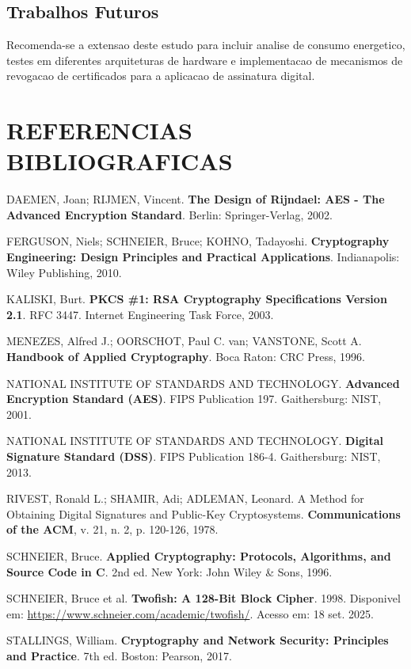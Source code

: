 \documentclass[12pt,a4paper,oneside]{article}
\begin{document}
\subsection{Trabalhos Futuros}

Recomenda-se a extensao deste estudo para incluir analise de consumo energetico, testes em diferentes arquiteturas de hardware e implementacao de mecanismos de revogacao de certificados para a aplicacao de assinatura digital.

\section{REFERENCIAS BIBLIOGRAFICAS}

DAEMEN, Joan; RIJMEN, Vincent. \textbf{The Design of Rijndael: AES - The Advanced Encryption Standard}. Berlin: Springer-Verlag, 2002.

FERGUSON, Niels; SCHNEIER, Bruce; KOHNO, Tadayoshi. \textbf{Cryptography Engineering: Design Principles and Practical Applications}. Indianapolis: Wiley Publishing, 2010.

KALISKI, Burt. \textbf{PKCS \#1: RSA Cryptography Specifications Version 2.1}. RFC 3447. Internet Engineering Task Force, 2003.

MENEZES, Alfred J.; OORSCHOT, Paul C. van; VANSTONE, Scott A. \textbf{Handbook of Applied Cryptography}. Boca Raton: CRC Press, 1996.

NATIONAL INSTITUTE OF STANDARDS AND TECHNOLOGY. \textbf{Advanced Encryption Standard (AES)}. FIPS Publication 197. Gaithersburg: NIST, 2001.

NATIONAL INSTITUTE OF STANDARDS AND TECHNOLOGY. \textbf{Digital Signature Standard (DSS)}. FIPS Publication 186-4. Gaithersburg: NIST, 2013.

RIVEST, Ronald L.; SHAMIR, Adi; ADLEMAN, Leonard. A Method for Obtaining Digital Signatures and Public-Key Cryptosystems. \textbf{Communications of the ACM}, v. 21, n. 2, p. 120-126, 1978.

SCHNEIER, Bruce. \textbf{Applied Cryptography: Protocols, Algorithms, and Source Code in C}. 2nd ed. New York: John Wiley \& Sons, 1996.

SCHNEIER, Bruce et al. \textbf{Twofish: A 128-Bit Block Cipher}. 1998. Disponivel em: \url{https://www.schneier.com/academic/twofish/}. Acesso em: 18 set. 2025.

STALLINGS, William. \textbf{Cryptography and Network Security: Principles and Practice}. 7th ed. Boston: Pearson, 2017.
\end{document}
